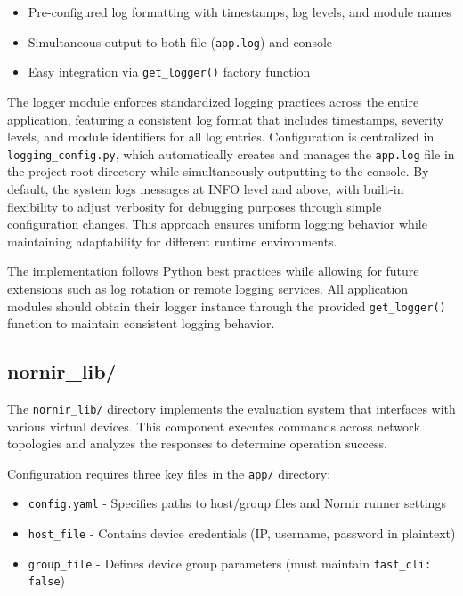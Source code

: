         \begin{itemize}
            \item Pre-configured log formatting with timestamps, log levels, and module names
            \item Simultaneous output to both file (\texttt{app.log}) and console
            \item Easy integration via \texttt{get\_logger()} factory function
        \end{itemize}

        The logger module enforces standardized logging practices across the entire application, featuring a consistent 
        log format that includes timestamps, severity levels, and module identifiers for all log entries. Configuration is 
        centralized in \texttt{logging\_config.py}, which automatically creates and manages the \texttt{app.log} file in the 
        project root directory while simultaneously outputting to the console. By default, the system logs messages at INFO 
        level and above, with built-in flexibility to adjust verbosity for debugging purposes through simple configuration 
        changes. This approach ensures uniform logging behavior while maintaining adaptability for different runtime 
        environments.

        The implementation follows Python best practices while allowing for future extensions such as log rotation 
        or remote logging services. All application modules should obtain their logger instance through the provided 
        \texttt{get\_logger()} function to maintain consistent logging behavior.

    \subsection{nornir\_lib/}

        The \texttt{nornir\_lib/} directory implements the evaluation system that interfaces with various virtual devices. 
        This component executes commands across network topologies and analyzes the responses to determine operation 
        success.

        Configuration requires three key files in the \texttt{app/} directory:
        \begin{itemize}
            \item \texttt{config.yaml} - Specifies paths to host/group files and Nornir runner settings
            \item \texttt{host\_file} - Contains device credentials (IP, username, password in plaintext)
            \item \texttt{group\_file} - Defines device group parameters (must maintain \texttt{fast\_cli: false})
        \end{itemize}

